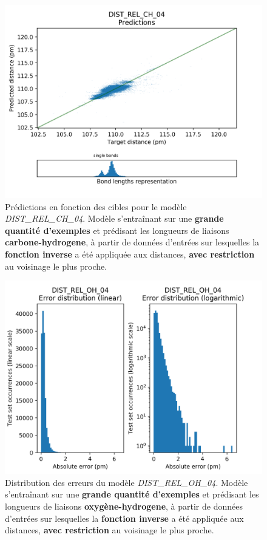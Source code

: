 \begin{figure}[!h]
	\centering
	
	\includegraphics[scale=0.75]{../figures/DIST_REL_CH_04/DIST_REL_CH_04_preds_targets.png}	
	
	\caption{Prédictions en fonction des cibles pour le modèle \emph{DIST\_REL\_CH\_04}. Modèle s'entraînant sur une \textbf{grande quantité d'exemples} et prédisant les longueurs de liaisons \textbf{carbone-hydrogene}, à partir de données d'entrées sur lesquelles la \textbf{fonction inverse} a été appliquée aux distances, \textbf{avec restriction} au voisinage le plus proche.}
	
\end{figure}


\begin{figure}[!h]
	\centering
	
	\includegraphics[scale=0.75]{../figures/DIST_REL_OH_04/DIST_REL_OH_04_distrib_rmse_val.png}	
	
	\caption{Distribution des erreurs du modèle \emph{DIST\_REL\_OH\_04}. Modèle s'entraînant sur une \textbf{grande quantité d'exemples} et prédisant les longueurs de liaisons \textbf{oxygène-hydrogene}, à partir de données d'entrées sur lesquelles la \textbf{fonction inverse} a été appliquée aux distances, \textbf{avec restriction} au voisinage le plus proche.}
\end{figure}

